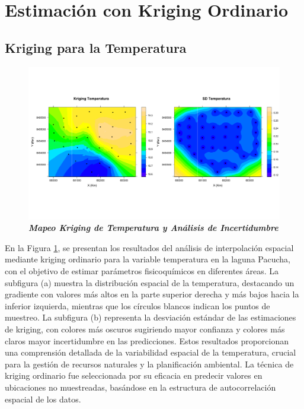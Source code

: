  
\section{Estimación con Kriging Ordinario}
\subsection{Kriging para la Temperatura}

\begin{figure}[!htb]
    \centering
    \includegraphics[width=1\linewidth]{Figuras_AED/ESTIMACION/Temperatura_KRIGING.pdf}
    \caption{\textbf{\textit{Mapeo Kriging de Temperatura y Análisis de Incertidumbre}} }
    \label{fig:enter-labelest}
\end{figure}

En la Figura \ref{fig:enter-labelest}, se presentan los resultados del análisis de interpolación espacial mediante kriging ordinario para la variable temperatura en la laguna Pacucha, con el objetivo de estimar parámetros fisicoquímicos en diferentes áreas. La subfigura (a) muestra la distribución espacial de la temperatura, destacando un gradiente con valores más altos en la parte superior derecha y más bajos hacia la inferior izquierda, mientras que los círculos blancos indican los puntos de muestreo. La subfigura (b) representa la desviación estándar de las estimaciones de kriging, con colores más oscuros sugiriendo mayor confianza y colores más claros mayor incertidumbre en las predicciones. Estos resultados proporcionan una comprensión detallada de la variabilidad espacial de la temperatura, crucial para la gestión de recursos naturales y la planificación ambiental. La técnica de kriging ordinario fue seleccionada por su eficacia en predecir valores en ubicaciones no muestreadas, basándose en la estructura de autocorrelación espacial de los datos.


